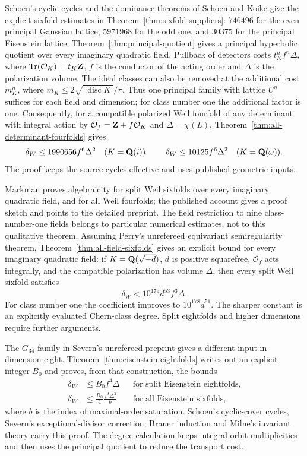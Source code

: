 Schoen's cyclic cycles and the dominance theorems of Schoen and Koike give the explicit sixfold estimates in Theorem~\ref{thm:sixfold-suppliers}: $746496$ for the even principal Gaussian lattice, $5971968$ for the odd one, and $30375$ for the principal Eisenstein lattice. Theorem~\ref{thm:principal-quotient} gives a principal hyperbolic quotient over every imaginary quadratic field. Pullback of detectors costs $t_K^nf^n\Delta$, where $\operatorname{Tr}(\mathcal O_K)=t_K\mathbf Z$, $f$ is the conductor of the acting order and $\Delta$ is the polarization volume. The ideal classes can also be removed at the additional cost $m_K^n$, where $m_K\le2\sqrt{|\operatorname{disc}K|}/\pi$. Thus one principal family with lattice $U^n$ suffices for each field and dimension; for class number one the additional factor is one. Consequently, for a compatible polarized Weil fourfold of any determinant with integral action by $\mathcal O_f=\mathbf Z+f\mathcal O_K$ and $\Delta=\chi(L)$, Theorem~\ref{thm:all-determinant-fourfolds} gives
\[
 \delta_W\le1990656 f^6\Delta^2\quad(K=\mathbf Q(i)),
 \qquad\delta_W\le10125 f^6\Delta^2\quad(K=\mathbf Q(\omega)).
\]
The proof keeps the source cycles effective and uses published geometric inputs.

Markman \cite[Theorem~1.2]{MarkmanICM} proves algebraicity for split Weil sixfolds over every imaginary quadratic field, and for all Weil fourfolds; the published account gives a proof sketch and points to the detailed preprint. The field restriction to nine class-number-one fields belongs to particular numerical estimates, not to this qualitative theorem. Assuming Perry's unrefereed equivariant semiregularity theorem, Theorem~\ref{thm:all-field-sixfolds} gives an explicit bound for every imaginary quadratic field: if $K=\mathbf Q(\sqrt{-d})$, $d$ is positive squarefree, $\mathcal O_f$ acts integrally, and the compatible polarization has volume $\Delta$, then every split Weil sixfold satisfies
\[
 \delta_W<10^{179}d^{53}f^3\Delta.
\]
For class number one the coefficient improves to $10^{178}d^{51}$. The sharper constant is an explicitly evaluated Chern-class degree. Split eightfolds and higher dimensions require further arguments.

The $G_{34}$ family in Severn's unrefereed preprint gives a different input in dimension eight. Theorem~\ref{thm:eisenstein-eightfolds} writes out an explicit integer $B_0$ and proves, from that construction, the bounds
\[
 \begin{aligned}
 \delta_W&\le B_0f^4\Delta
 &&\text{for split Eisenstein eightfolds},\\
 \delta_W&\le\frac{B_0}{4}\frac{f^9\Delta^2}{b}
 &&\text{for all Eisenstein sixfolds},
 \end{aligned}
\]
where $b$ is the index of maximal-order saturation. Schoen's cyclic-cover cycles, Severn's exceptional-divisor correction, Brauer induction and Milne's invariant theory carry this proof. The degree calculation keeps integral orbit multiplicities and then uses the principal quotient to reduce the transport cost.

